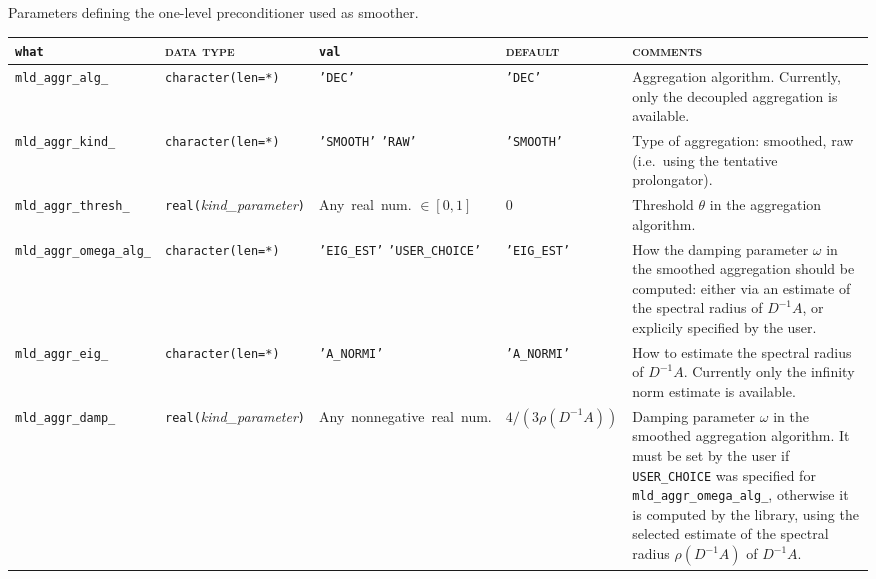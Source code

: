 \caption{Parameters defining the one-level preconditioner used as smoother.
\label{tab:p_smoother}}  
\esideways
                   
\bsideways
\begin{center}
\begin{tabular}{|l|l|p{2.4cm}|p{2.4cm}|p{7cm}|}
\hline
\verb|what|              & \textsc{data type}        &  \verb|val|      &  \textsc{default}  &
\textsc{comments} \\ \hline
\verb|mld_aggr_alg_|     & \verb|character(len=*)|
                         & \texttt{'DEC'}
                         & \texttt{'DEC'}
                         & Aggregation algorithm. Currently, only the decoupled aggregation is available. \\ \hline
\verb|mld_aggr_kind_|    & \verb|character(len=*)|
                         & \texttt{'SMOOTH'} \hspace{2.5cm} \texttt{'RAW'}
                         & \texttt{'SMOOTH'}
                         & Type of aggregation: smoothed, raw (i.e.\ using the tentative prolongator). \\ \hline
\verb|mld_aggr_thresh_|  & \verb|real(|\emph{kind\_parameter}\verb|)|
                         & Any~real~num. $\in [0, 1]$
                         & 0
                         & Threshold $\theta$ in the aggregation algorithm. \\ \hline
\verb|mld_aggr_omega_alg_| & \verb|character(len=*)|
                         & \texttt{'EIG\_EST'} \hspace{2.5cm} \texttt{'USER\_CHOICE'}
                         & \texttt{'EIG\_EST'}
                         & How the damping parameter $\omega$ in the
                         smoothed aggregation should be computed:
                         either via an estimate of the spectral radius of
                         $D^{-1}A$, or explicily
                         specified by the user. \\ \hline
\verb|mld_aggr_eig_|     & \verb|character(len=*)|
                         & \texttt{'A\_NORMI'}
                         & \texttt{'A\_NORMI'}
                         & How to estimate the spectral radius of $D^{-1}A$.
                           Currently only the infinity norm estimate
                           is available. \\ \hline
\verb|mld_aggr_damp_|    & \verb|real(|\emph{kind\_parameter}\verb|)|
                         & Any~nonnegative~real~num.
                         & $4/(3\rho(D^{-1}A))$
                         & Damping parameter $\omega$ in the smoothed aggregation algorithm. 
                           It must be set by the user if
                           \verb|USER_CHOICE| was specified for 
                           \verb|mld_aggr_omega_alg_|,
                           otherwise it is computed by the library, using the
                           selected estimate of the spectral radius $\rho(D^{-1}A)$ of
                           $D^{-1}A$.\\
\hline
\end{tabular}
\end{center}
